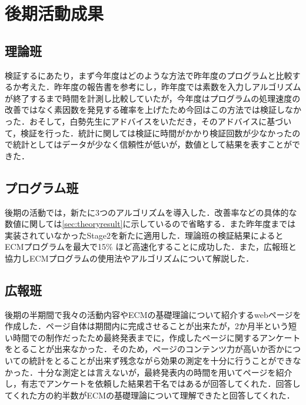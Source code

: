 \documentclass[openany,11pt,papersize]{jsbook}
\begin{document}
\chapter{後期活動成果}

\section{理論班}
検証するにあたり，まず今年度はどのような方法で昨年度のプログラムと比較するか考えた．昨年度の報告書を参考にし，昨年度では素数を入力しアルゴリズムが終了するまで時間を計測し比較していたが，今年度はプログラムの処理速度の改善ではなく素因数を発見する確率を上げたため今回はこの方法では検証しなかった．おそして，白勢先生にアドバイスをいただき，そのアドバイスに基づいて，検証を行った．統計に関しては検証に時間がかかり検証回数が少なかったので統計としてはデータが少なく信頼性が低いが，数値として結果を表すことができた．

\section{プログラム班}
後期の活動では，新たに3つのアルゴリズムを導入した．改善率などの具体的な数値に関しては\ref{sec:theoryresult}に示しているので省略する．また昨年度までは実装されていなかったStage2を新たに適用した．理論班の検証結果によるとECMプログラムを最大で15\% ほど高速化することに成功した．また，広報班と協力しECMプログラムの使用法やアルゴリズムについて解説した．

\section{広報班}
後期の半期間で我々の活動内容やECMの基礎理論について紹介するwebページを作成した．ページ自体は期間内に完成させることが出来たが，2か月半という短い時間での制作だったため最終発表までに，作成したページに関するアンケートをとることが出来なかった．そのため，ページのコンテンツ力が高いか否かについての統計をとることが出来ず残念ながら効果の測定を十分に行うことができなかった．十分な測定とは言えないが，最終発表内の時間を用いてページを紹介し，有志でアンケートを依頼した結果若干名ではあるが回答してくれた．回答してくれた方の約半数がECMの基礎理論について理解できたと回答してくれた．

\end{document}
